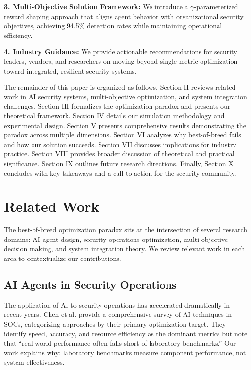 \documentclass[10pt,conference]{IEEEtran}
\begin{document}
\textbf{3. Multi-Objective Solution Framework:} We introduce a $\gamma$-parameterized reward shaping approach that aligns agent behavior with organizational security objectives, achieving 94.5\% detection rates while maintaining operational efficiency.

\textbf{4. Industry Guidance:} We provide actionable recommendations for security leaders, vendors, and researchers on moving beyond single-metric optimization toward integrated, resilient security systems.

The remainder of this paper is organized as follows. Section II reviews related work in AI security systems, multi-objective optimization, and system integration challenges. Section III formalizes the optimization paradox and presents our theoretical framework. Section IV details our simulation methodology and experimental design. Section V presents comprehensive results demonstrating the paradox across multiple dimensions. Section VI analyzes why best-of-breed fails and how our solution succeeds. Section VII discusses implications for industry practice. Section VIII provides broader discussion of theoretical and practical significance. Section IX outlines future research directions. Finally, Section X concludes with key takeaways and a call to action for the security community.

\section{Related Work}

The best-of-breed optimization paradox sits at the intersection of several research domains: AI agent design, security operations optimization, multi-objective decision making, and system integration theory. We review relevant work in each area to contextualize our contributions.

\subsection{AI Agents in Security Operations}

The application of AI to security operations has accelerated dramatically in recent years. Chen et al. \cite{chen2022ai} provide a comprehensive survey of AI techniques in SOCs, categorizing approaches by their primary optimization target. They identify speed, accuracy, and resource efficiency as the dominant metrics but note that ``real-world performance often falls short of laboratory benchmarks.'' Our work explains why: laboratory benchmarks measure component performance, not system effectiveness.
\end{document}
